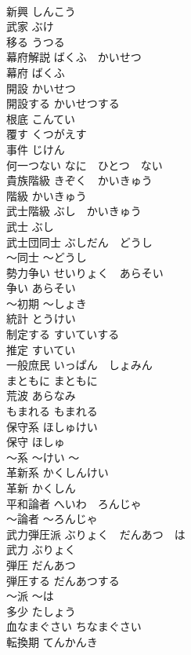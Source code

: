 \documentclass[8pt]{extreport}
\begin{document}
\begin{CJK}{UTF8}{min}
\\	新興	しんこう	
\\	武家	ぶけ	
\\	移る	うつる	
\\	幕府解説	ばくふ　かいせつ	
\\	幕府	ばくふ	
\\	開設	かいせつ	
\\	開設する	かいせつする	
\\	根底	こんてい	
\\	覆す	くつがえす	
\\	事件	じけん	
\\	何一つない	なに　ひとつ　ない	
\\	貴族階級	きぞく　かいきゅう	
\\	階級	かいきゅう	
\\	武士階級	ぶし　かいきゅう	
\\	武士	ぶし	
\\	武士団同士	ぶしだん　どうし	
\\	〜同士	〜どうし	
\\	勢力争い	せいりょく　あらそい	
\\	争い	あらそい	
\\	〜初期	〜しょき	
\\	統計	とうけい	
\\	制定する	すいていする	
\\	推定	すいてい	
\\	一般庶民	いっぱん　しょみん	
\\	まともに	まともに	
\\	荒波	あらなみ	
\\	もまれる	もまれる	
\\	保守系	ほしゅけい	
\\	保守	ほしゅ	
\\	〜系	〜けい	〜
\\	革新系	かくしんけい	
\\	革新	かくしん	
\\	平和論者	へいわ　ろんじゃ	
\\	〜論者	〜ろんじゃ	
\\	武力弾圧派	ぶりょく　だんあつ　は	
\\	武力	ぶりょく	
\\	弾圧	だんあつ	
\\	弾圧する	だんあつする	
\\	〜派	〜は	
\\	多少	たしょう	
\\	血なまぐさい	ちなまぐさい	
\\	転換期	てんかんき	

\end{CJK}
\end{document}
